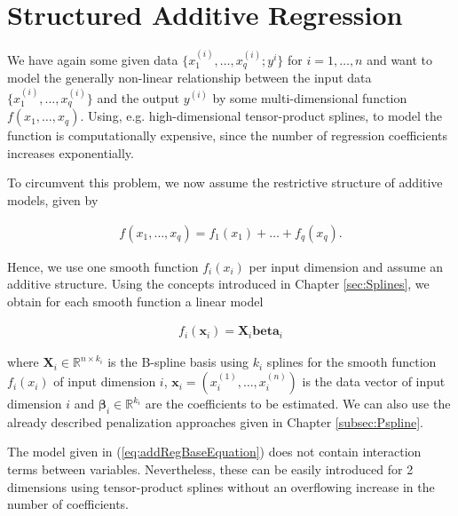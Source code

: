 \documentclass[10pt,a4paper]{article}
\begin{document}
\section{Structured Additive Regression} \label{sec:STAR}

We have again some given data $\{x^{(i)}_{1}, \dots, x^{(i)}_{q}; y^i\}$ for $i = 1, \dots, n$ and want to model the generally non-linear relationship between the input data $\{x^{(i)}_{1}, \dots, x^{(i)}_{q}\}$ and the output $y^{(i)}$ by some multi-dimensional function $f(x_1, \dots, x_q)$.  Using, e.g. high-dimensional tensor-product splines, to model the function is computationally expensive, since the number of regression coefficients increases exponentially.

To circumvent this problem, we now assume the restrictive structure of additive models, given by

\begin{align} \label{eq:addRegBaseEquation}
	f(x_1, \dots, x_q) = f_1(x_1) + \dots + f_q(x_q).
\end{align}

Hence, we use one smooth function $f_i(x_i)$ per input dimension and assume an additive structure. \cite{fahrmeir2013regression} Using the concepts introduced in Chapter \ref{sec:Splines}, we obtain for each smooth function a linear model

\begin{align}
	f_i(\boldsymbol{x}_i) = \boldsymbol{X}_i \boldsymbol{beta}_i
\end{align}

where $\boldsymbol{X}_i \in \mathbb R^{n \times k_i}$ is the B-spline basis using $k_i$ splines for the smooth function $f_i(x_i)$ of input dimension $i$, $\boldsymbol{x}_i = (x_i^{(1)}, \dots, x_i^{(n)})$ is the data vector of input dimension $i$ and $\boldsymbol{\beta}_i \in \mathbb R^{k_i}$ are the coefficients to be estimated. We can also use the already described penalization approaches given in Chapter \ref{subsec:Pspline}. 

The model given in (\ref{eq:addRegBaseEquation}) does not contain interaction terms between variables. Nevertheless, these can be easily introduced for 2 dimensions using tensor-product splines without an overflowing increase in the number of coefficients.
\end{document}

